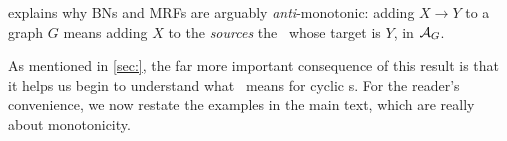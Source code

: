  explains why BNs and MRFs are arguably \emph{anti}-monotonic: adding $X \to Y$ to a graph $G$ means adding $X$ to the \emph{sources} the \arc\ whose target is $Y$, 
in $\mathcal A_G$.
%

As mentioned in \cref{sec:}, 
the far more important consequence of this result is that it
helps us begin to understand what \scibility\ means for cyclic \hgraph s.
For the reader's convenience, we now restate the examples in the main text,
which are really about monotonicity.

